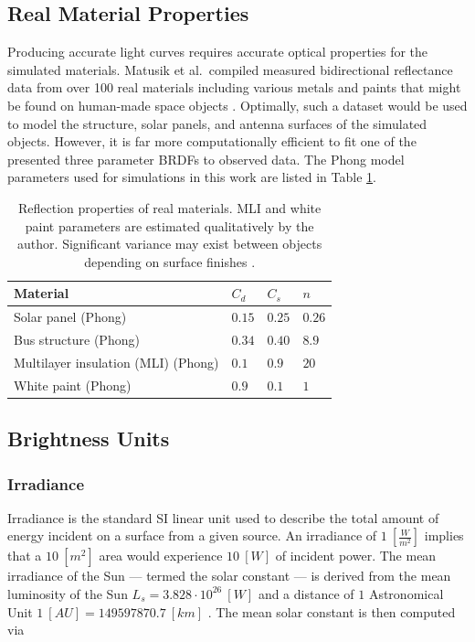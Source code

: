 \subsection{Real Material Properties}

Producing accurate light curves requires accurate optical properties for the simulated materials. Matusik et al.\ compiled measured bidirectional reflectance data from over 100 real materials including various metals and paints that might be found on human-made space objects \cite{matusik2003}. Optimally, such a dataset would be used to model the structure, solar panels, and antenna surfaces of the simulated objects. However, it is far more computationally efficient to fit one of the presented three parameter BRDFs to observed data. The Phong model parameters used for simulations in this work are listed in Table \ref{tb:real_matprops}.

\begin{table}[]
  \centering
  \caption{Reflection properties of real materials. MLI and white paint parameters are estimated qualitatively by the author. Significant variance may exist between objects depending on surface finishes \cite{matusik2003}.}
  \vspace*{6pt}
  \begin{tabular}{|l|l|l|l|}
  \hline
  \textbf{Material} & $C_d$ & $C_s$ & $n$ \\ \hline
  Solar panel (Phong) \cite{fankhauser2023}              & $0.15$ & $0.25$ & $0.26$  \\ \hline
  Bus structure (Phong) \cite{fankhauser2023}               & $0.34$ & $0.40$ & $8.9$  \\ \hline
  Multilayer insulation (MLI) (Phong) & $0.1$ & $0.9$ & $20$ \\ \hline
  White paint (Phong) & $0.9$ & $0.1$ & $1$ \\ \hline
  \end{tabular}
  \label{tb:real_matprops}
\end{table}

\subsection{Brightness Units} \label{sec:brightness_units}

\subsubsection{Irradiance}

Irradiance is the standard SI linear unit used to describe the total amount of energy incident on a
surface from a given source. An irradiance of $1 \: \left[ \frac{W}{m^2} \right]$ implies that a $10
\: [m^2]$ area would experience $10 \: [W]$ of incident power. The mean irradiance of the Sun --- termed the solar constant --- is derived from the mean luminosity of the Sun $L_s = 3.828\cdot10^{26} \: [W]$ and a distance of $1$ Astronomical Unit $1 \: [AU] = 149597870.7 \: [km]$ \cite{frueh2019notes}. The mean solar constant is then computed via

